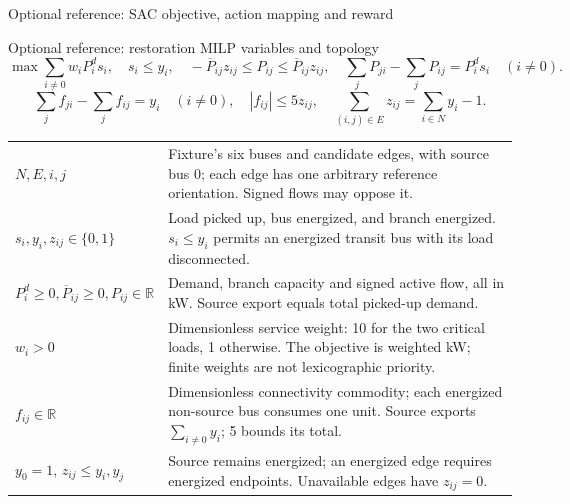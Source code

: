 \begin{frame}[t]{Optional reference: SAC objective, action mapping and reward}
\end{frame}

\begin{frame}[t]{Optional reference: restoration MILP variables and topology}
\setlength{\abovedisplayskip}{3pt}\setlength{\belowdisplayskip}{3pt}\setlength{\parskip}{0pt}
\[
\max\sum_{i\ne0}w_iP_i^d s_i,\quad s_i\leq y_i,\quad
-\overline P_{ij}z_{ij}\leq P_{ij}\leq\overline P_{ij}z_{ij},\quad
\sum_jP_{ji}-\sum_jP_{ij}=P_i^d s_i\quad(i\ne0).
\]
\[
\sum_j f_{ji}-\sum_j f_{ij}=y_i\quad(i\ne0),\quad |f_{ij}|\leq5z_{ij},\quad
\sum_{(i,j)\in E}z_{ij}=\sum_{i\in N}y_i-1.
\]
\renewcommand{\arraystretch}{.98}
\begin{tabular}{@{}>{\raggedright\arraybackslash}p{.25\linewidth}>{\raggedright\arraybackslash}p{.68\linewidth}@{}}
$N,E,i,j$ & Fixture's six buses and candidate edges, with source bus $0$; each edge has one arbitrary reference orientation. Signed flows may oppose it. \\
$s_i,y_i,z_{ij}\in\{0,1\}$ & Load picked up, bus energized, and branch energized. $s_i\leq y_i$ permits an energized transit bus with its load disconnected. \\
$P_i^d\geq0,\overline P_{ij}\geq0,P_{ij}\in\mathbb R$ & Demand, branch capacity and signed active flow, all in kW. Source export equals total picked-up demand. \\
$w_i>0$ & Dimensionless service weight: 10 for the two critical loads, 1 otherwise. The objective is weighted kW; finite weights are not lexicographic priority. \\
$f_{ij}\in\mathbb R$ & Dimensionless connectivity commodity; each energized non-source bus consumes one unit. Source exports $\sum_{i\ne0}y_i$; 5 bounds its total. \\
$y_0=1$, $z_{ij}\leq y_i,y_j$ & Source remains energized; an energized edge requires energized endpoints. Unavailable edges have $z_{ij}=0$. \\

\end{tabular}
\end{frame}
